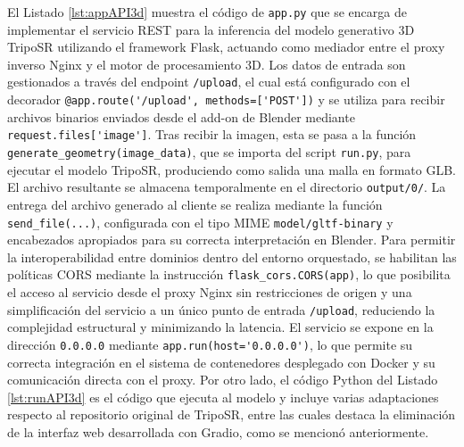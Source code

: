 
El Listado \ref{lst:appAPI3d} muestra el código de \verb|app.py| que se encarga de implementar el servicio REST para la inferencia del modelo generativo 3D TripoSR utilizando el framework Flask, actuando como mediador entre el proxy inverso Nginx y el motor de procesamiento 3D.
Los datos de entrada son gestionados a través del endpoint \verb|/upload|, el cual está configurado con el decorador \verb|@app.route('/upload', methods=['POST'])| y se utiliza para recibir archivos binarios enviados desde el add-on de Blender mediante \verb|request.files['image']|. Tras recibir la imagen, esta se pasa a la función \verb|generate_geometry(image_data)|, que se importa del script \verb|run.py|, para ejecutar el modelo TripoSR, produciendo como salida una malla en formato GLB. El archivo resultante se almacena temporalmente en el directorio \verb|output/0/|. La entrega del archivo generado al cliente se realiza mediante la función \verb|send_file(...)|, configurada con el tipo MIME \verb|model/gltf-binary| y encabezados apropiados para su correcta interpretación en Blender. Para permitir la interoperabilidad entre dominios dentro del entorno orquestado, se habilitan las políticas CORS mediante la instrucción \verb|flask_cors.CORS(app)|, lo que posibilita el acceso al servicio desde el proxy Nginx sin restricciones de origen y una simplificación del servicio a un único punto de entrada \verb|/upload|, reduciendo la complejidad estructural y minimizando la latencia. El servicio se expone en la dirección \verb|0.0.0.0| mediante \verb|app.run(host='0.0.0.0')|, lo que permite su correcta integración en el sistema de contenedores desplegado con Docker y su comunicación directa con el proxy. Por otro lado, el código Python del Listado \ref{lst:runAPI3d} es el código que ejecuta al modelo y incluye varias adaptaciones respecto al repositorio original de TripoSR, entre las cuales destaca la eliminación de la interfaz web desarrollada con Gradio, como se mencionó anteriormente.

